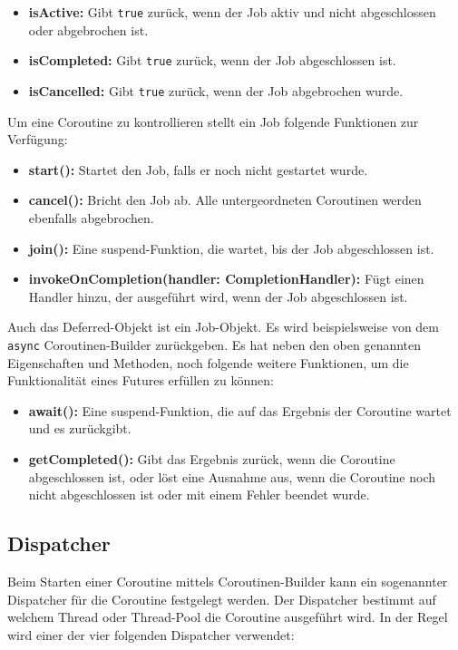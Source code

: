 \documentclass[fontsize=12pt,paper=a4,twoside=semi,parskip=half-,headsepline,headinclude]{scrreprt}
\begin{document}
\begin{itemize}
	\item \textbf{isActive:} Gibt \texttt{true} zurück, wenn der Job aktiv und nicht abgeschlossen oder abgebrochen ist.
	\item \textbf{isCompleted:} Gibt \texttt{true} zurück, wenn der Job abgeschlossen ist.
	\item \textbf{isCancelled:} Gibt \texttt{true} zurück, wenn der Job abgebrochen wurde.
\end{itemize}

Um eine Coroutine zu kontrollieren stellt ein Job folgende Funktionen zur Verfügung:

\begin{itemize}
	\item \textbf{start():} Startet den Job, falls er noch nicht gestartet wurde.
	\item \textbf{cancel():} Bricht den Job ab. Alle untergeordneten Coroutinen werden ebenfalls abgebrochen.
	\item \textbf{join():} Eine suspend-Funktion, die wartet, bis der Job abgeschlossen ist.
	\item \textbf{invokeOnCompletion(handler: CompletionHandler):} Fügt einen Handler hinzu, der ausgeführt wird, wenn der Job abgeschlossen ist.
\end{itemize}

Auch das Deferred-Objekt ist ein Job-Objekt. Es wird beispielsweise von dem \texttt{async} Coroutinen-Builder zurückgeben. Es hat neben den oben genannten Eigenschaften und Methoden, noch folgende weitere Funktionen, um die Funktionalität eines Futures erfüllen zu können:

\begin{itemize}
	\item \textbf{await():} Eine suspend-Funktion, die auf das Ergebnis der Coroutine wartet und es zurückgibt.
	\item \textbf{getCompleted():} Gibt das Ergebnis zurück, wenn die Coroutine abgeschlossen ist, oder löst eine Ausnahme aus, wenn die Coroutine noch nicht abgeschlossen ist oder mit einem Fehler beendet wurde.
\end{itemize}

\subsection{Dispatcher}

Beim Starten einer Coroutine mittels Coroutinen-Builder kann ein sogenannter Dispatcher für die Coroutine festgelegt werden. Der Dispatcher bestimmt auf welchem Thread oder Thread-Pool die Coroutine ausgeführt wird. In der Regel wird einer der vier folgenden Dispatcher verwendet:
\end{document}
